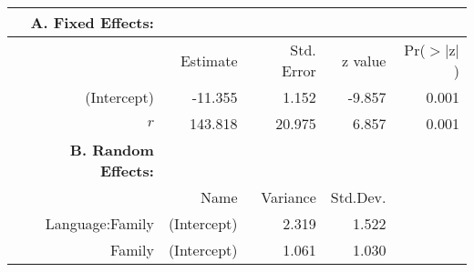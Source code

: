 \begin{tabular}{rrrrr}
 {\bf A. Fixed Effects:} \\
\hline
 & Estimate & Std. Error & z value & Pr($>$$|$z$|$) \\ 
  \hline
(Intercept) & -11.355 & 1.152 & -9.857 & 0.001 \\ 
  $r$ & 143.818 & 20.975 & 6.857 & 0.001 \\ 

\hline \hline
{\bf B. Random Effects:} \\
\hline
& Name & Variance & Std.Dev. \\
\hline
Language:Family & (Intercept) & 2.319 & 1.522 \\
Family & (Intercept) & 1.061 & 1.030 \\
\end{tabular}
